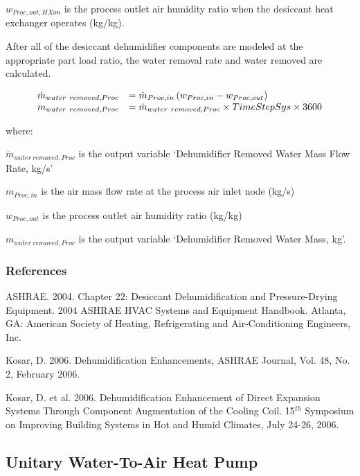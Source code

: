 \({w_{Proc,out,HXon}}\) is the process outlet air humidity ratio when the desiccant heat exchanger operates (kg/kg).

After all of the desiccant dehumidifier components are modeled at the appropriate part load ratio, the water removal rate and water removed are calculated.

\begin{equation}
  \begin{array}{rl}
    \dot{m}_{water~removed,Proc} & = \dot{m}_{Proc,in} \left(w_{Proc,in} - w_{Proc,out}\right) \\
    m_{water~removed,Proc}       & = \dot{m}_{water~removed,Proc} \times TimeStepSys \times 3600
  \end{array}
\end{equation}

where:

\({\dot{m}_{water~removed,Proc}}\) is the output variable `Dehumidifier Removed Water Mass Flow Rate, kg/s'

\({\dot{m}_{Proc,in}}\) is the air mass flow rate at the process air inlet node (kg/s)

\({w_{Proc,out}}\) is the process outlet air humidity ratio (kg/kg)

\({m_{water~removed,Proc}}\) is the output variable `Dehumidifier Removed Water Mass, kg'.

\subsubsection{References}\label{references-000}

ASHRAE. 2004. Chapter 22: Desiccant Dehumidification and Pressure-Drying Equipment. 2004 ASHRAE HVAC Systems and Equipment Handbook. Atlanta, GA: American Society of Heating, Refrigerating and Air-Conditioning Engineers, Inc.

Kosar, D. 2006. Dehumidification Enhancements, ASHRAE Journal, Vol. 48, No. 2, February 2006.

Kosar, D. et al. 2006. Dehumidification Enhancement of Direct Expansion Systems Through Component Augmentation of the Cooling Coil. 15\(^{th}\) Symposium on Improving Building Systems in Hot and Humid Climates, July 24-26, 2006.

\subsection{Unitary Water-To-Air Heat Pump}\label{unitary-water-to-air-heat-pump}

